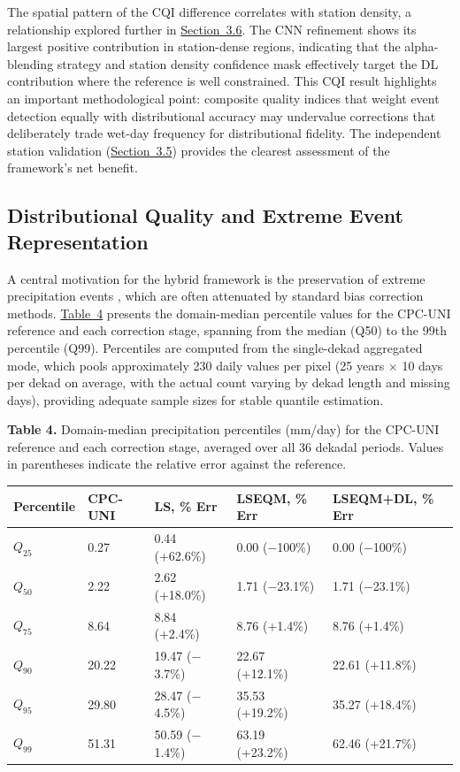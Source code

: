 \documentclass[11pt,a4paper]{article}
\begin{document}
The spatial pattern of the CQI difference correlates with station
density, a relationship explored further in \hyperref[role-station-density]{Section~3.6}. The CNN
refinement shows its largest positive contribution in station-dense
regions, indicating that the alpha-blending strategy and station density
confidence mask effectively target the DL contribution where the
reference is well constrained. This CQI result highlights an important
methodological point: composite quality indices that weight event
detection equally with distributional accuracy may undervalue
corrections that deliberately trade wet-day frequency for distributional
fidelity. The independent station validation (\hyperref[station-level-ground-truth-validation]{Section~3.5}) provides the
clearest assessment of the framework's net benefit.

\subsection{Distributional Quality and Extreme Event
Representation}\label{distributional-quality}

A central motivation for the hybrid framework is the preservation of
extreme precipitation events \cite{ref46}, which are often attenuated by
standard bias correction methods. \hyperref[tab:4]{Table~4} presents the domain-median
percentile values for the CPC-UNI reference and each correction stage,
spanning from the median (Q50) to the 99th percentile (Q99). Percentiles
are computed from the single-dekad aggregated mode, which pools
approximately 230 daily values per pixel (25 years \(\times\) 10 days
per dekad on average, with the actual count varying by dekad length and missing days), providing adequate sample sizes for stable quantile
estimation.

\label{tab:4}
\textbf{Table 4.} Domain-median precipitation percentiles (mm/day) for
the CPC-UNI reference and each correction stage, averaged over all 36
dekadal periods. Values in parentheses indicate the relative error
against the reference.

\begingroup\small
\begin{longtable}[]{@{}lllll@{}}
\toprule
Percentile & CPC-UNI & LS, \% Err & LSEQM, \% Err & LSEQM+DL, \% Err \\
\midrule
\endhead
\bottomrule
\endlastfoot
\(Q_{25}\) & 0.27 & 0.44 (+62.6\%) & 0.00 ($-$100\%) & 0.00 ($-$100\%) \\
\(Q_{50}\) & 2.22 & 2.62 (+18.0\%) & 1.71 ($-$23.1\%) & 1.71 ($-$23.1\%) \\
\(Q_{75}\) & 8.64 & 8.84 (+2.4\%) & 8.76 (+1.4\%) & 8.76 (+1.4\%) \\
\(Q_{90}\) & 20.22 & 19.47 ($-$3.7\%) & 22.67 (+12.1\%) & 22.61 (+11.8\%) \\
\(Q_{95}\) & 29.80 & 28.47 ($-$4.5\%) & 35.53 (+19.2\%) & 35.27 (+18.4\%) \\
\(Q_{99}\) & 51.31 & 50.59 ($-$1.4\%) & 63.19 (+23.2\%) & 62.46 (+21.7\%) \\
\end{longtable}
\endgroup
\end{document}

